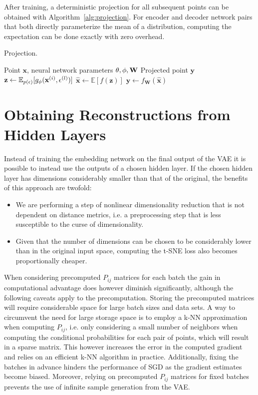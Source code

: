 
After training, a deterministic projection for all subsequent points can be obtained with Algorithm~\ref{alg:projection}. For encoder and decoder network pairs that both directly parameterize the mean of a distribution, computing the expectation can be done exactly with zero overhead.

\begin{algorithm}[H]
  \caption{Projection.}
  \label{alg:projection}
  \begin{algorithmic}[1]
    \Require Point $\mathbf{x}$, neural network parameters $\mathbf{\theta}, \mathbf{\phi}, \mathbf{W}$
    \Ensure Projected point $\mathbf{y}$
    \State $\mathbf{z} \gets \mathbb{E}_{p(\mathbf{\epsilon})}[g_{\mathbf{\phi}}(\mathbf{x}^{(i)}, \mathbf{\epsilon}^{(l)})]$
    \State $\hat{\mathbf{x}} \gets \mathbb{E}[f(\mathbf{z})]$
    \State $\mathbf{y} \gets f_{\mathbf{W}}(\hat{\mathbf{x}})$
  \end{algorithmic}
\end{algorithm}

\section{Obtaining Reconstructions from Hidden Layers}
\label{section:sampling_from_hidden_layers}

Instead of training the embedding network on the final output of the VAE it is possible to instead use the outputs of a chosen hidden layer. If the chosen hidden layer has dimensions considerably smaller than that of the original, the benefits of this approach are twofold:

\begin{itemize}
\item We are performing a step of nonlinear dimensionality reduction that is not dependent on distance metrics, i.e. a preprocessing step that is less susceptible to the curse of dimensionality.
\item Given that the number of dimensions can be chosen to be considerably lower than in the original input space, computing the t-SNE loss also becomes proportionally cheaper.
\end{itemize}

When considering precomputed $P_{ij}$ matrices for each batch the gain in computational advantage does however diminish significantly, although the following caveats apply to the precomputation. Storing the precomputed matrices will require considerable space for large batch sizes and data sets. A way to circumvent the need for large storage space is to employ a k-NN approximation when computing $P_{ij}$, i.e. only considering a small number of neighbors when computing the conditional probabilities for each pair of points, which will result in a sparse matrix. This however increases the error in the computed gradient and relies on an efficient k-NN algorithm in practice. Additionally, fixing the batches in advance hinders the performance of SGD as the gradient estimates become biased. Moreover, relying on precomputed $P_{ij}$ matrices for fixed batches prevents the use of infinite sample generation from the VAE.

